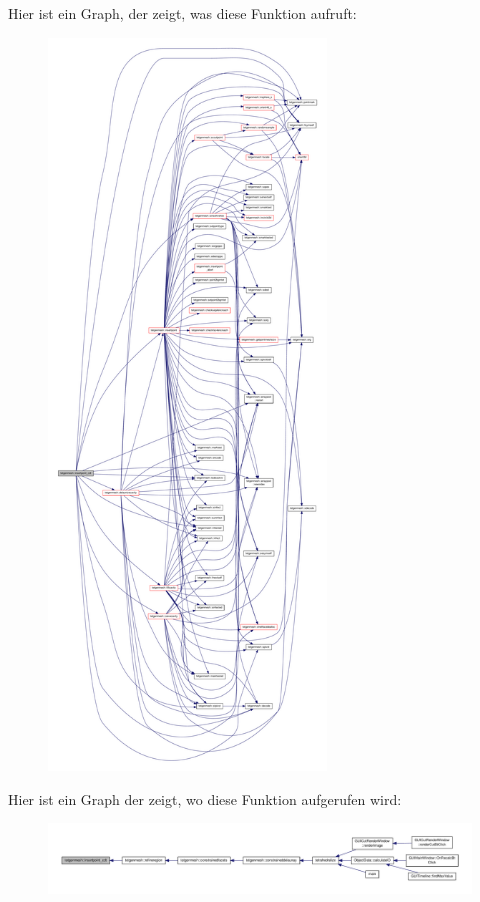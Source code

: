 Hier ist ein Graph, der zeigt, was diese Funktion aufruft\-:
\nopagebreak
\begin{figure}[H]
\begin{center}
\leavevmode
\includegraphics[height=550pt]{classtetgenmesh_a9c967ef25cfd6e06d6b9301302be3f70_cgraph}
\end{center}
\end{figure}




Hier ist ein Graph der zeigt, wo diese Funktion aufgerufen wird\-:
\nopagebreak
\begin{figure}[H]
\begin{center}
\leavevmode
\includegraphics[width=350pt]{classtetgenmesh_a9c967ef25cfd6e06d6b9301302be3f70_icgraph}
\end{center}
\end{figure}


